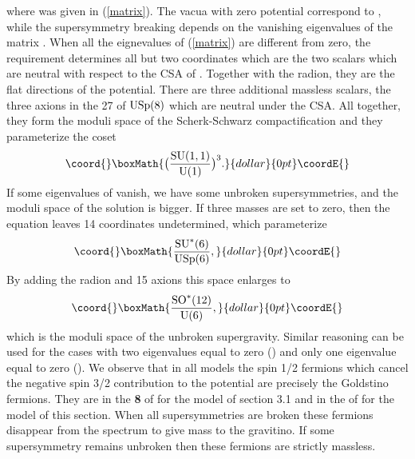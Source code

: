\documentclass[a4paper,12pt]{article}
\begin{document}
where \coordHE{} was given in (\ref{matrix}).
The vacua with zero potential correspond to \coordHE{}, while
the supersymmetry breaking depends on the vanishing eigenvalues of
the matrix  \coordHE{}. When all the eignevalues \coordHE{} of
(\ref{matrix}) are different from zero, the requirement
\coordHE{} determines all but two coordinates which are the
two scalars which are neutral with respect to the CSA of
\coordHE{}.  Together with the radion, they are the flat
directions of the potential. There are three additional massless
scalars, the three axions in the 27 of $\mathrm{USp}(8)$\coordHE{} which are
neutral under the CSA. All together, they form the moduli space of
the Scherk-Schwarz compactification and they parameterize the
coset $$\coord{}\boxMath{\bigl(\frac{\rSU(1,1)}{\rU(1)}\bigr)^3.}{dollar}{0pt}\coordE{}$$
If some eigenvalues \coordHE{} of \coordHE{} vanish, we have some unbroken
supersymmetries, and the moduli space of the solution is bigger.
If three masses are set to zero, then the equation \coordHE{}
leaves 14 coordinates undetermined, which parameterize
$$\coord{}\boxMath{\frac{\rSU^*(6)}{\rUSp(6)},}{dollar}{0pt}\coordE{}$$
 By adding the radion and 15 axions this space enlarges to $$\coord{}\boxMath{\frac{\rSO^*(12)}{\rU(6)},}{dollar}{0pt}\coordE{}$$ which is
the
moduli space of the \coordHE{} unbroken supergravity.
 Similar reasoning can be used for the cases with two eigenvalues equal to zero (\coordHE{}) and only one
eigenvalue equal to zero (\coordHE{}). We observe that in all models the spin 1/2 fermions which cancel
the negative spin 3/2 contribution to the potential are precisely the Goldstino fermions. They are in
the {\bf 8} of \coordHE{} for  the \coordHE{} model of section 3.1 and in the \coordHE{} of
\coordHE{} for the \coordHE{} model of this section. When all supersymmetries are broken these fermions
disappear from the spectrum to give mass to the gravitino. If some supersymmetry remains unbroken
then these fermions are strictly massless.
\end{document}
